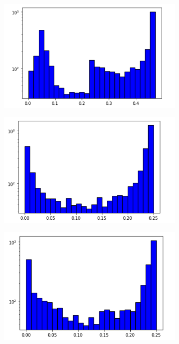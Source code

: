 \documentclass[11pt,twoside,a4paper]{article}
\begin{document}
\begin{figure}[!b]
    \centering
    \begin{subfigure}{0.49\textwidth}
	\includegraphics[width=\linewidth]{histo_CNN_all_real+fake.png}
        \caption{}
    \end{subfigure}
    \begin{subfigure}{0.49\textwidth}
	\includegraphics[width=\linewidth]{histo_BNN_all_real+fake.png}
        \caption{}
    \end{subfigure}
	\begin{subfigure}{0.49\textwidth}
	\includegraphics[width=\linewidth]{histo_Custom_all_real+fake.png}
        \caption{}
    \end{subfigure}
    \caption{}
    \label{fig:histograms}
\end{figure}
\end{document}
